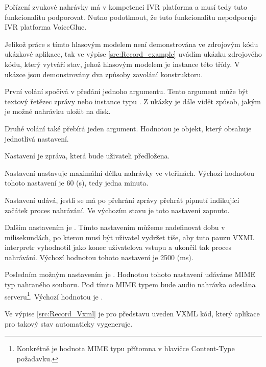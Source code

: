 \documentclass[ing,male,java,dept460]{diploma}						%
\begin{document}
Pořízení zvukové nahrávky má v kompetenci IVR platforma a musí tedy tuto funkcionalitu podporovat. Nutno podotknout, že tuto funkcionalitu nepodporuje IVR platforma VoiceGlue.

Jelikož práce s tímto hlasovým modelem není demonstrována ve zdrojovým kódu ukázkové aplikace, tak ve výpise \ref{src:Record_example} uvádím ukázku zdrojového kódu, který vytváří stav, jehož hlasovým modelem je instance této třídy. V ukázce jsou demonstrovány dva způsoby zavolání konstruktoru.

První volání spočívá v předání jednoho argumentu. Tento argument může být textový řetězec zprávy nebo instance typu . Z ukázky je dále vidět způsob, jakým je možné nahrávku uložit na disk.

Druhé volání také přebírá jeden argument. Hodnotou je objekt, který obsahuje jednotlivá nastavení.

Nastavení  je zpráva, která bude uživateli předložena.

Nastavení  nastavuje maximální délku nahrávky ve vteřinách. Výchozí hodnotou tohoto nastavení je 60 (s), tedy jedna minuta.

Nastavení  udává, jestli se má po přehrání zprávy přehrát pípnutí indikující začátek proces nahrávání. Ve výchozím stavu je toto nastavení zapnuto.

Dalším nastavením je . Tímto nastavením můžeme nadefinovat dobu v milisekundách, po kterou musí být uživatel vydržet tiše, aby tuto pauzu VXML interpretr vyhodnotil jako konec uživatelova vstupu a ukončil tak proces nahrávání. Výchozí hodnotou tohoto nastavení je 2500 (ms).

Posledním možným nastavením je . Hodnotou tohoto nastavení udáváme MIME typ nahraného souboru. Pod tímto MIME typem bude audio nahrávka odeslána serveru\footnote{Konkrétně je hodnota MIME typu přítomna v hlavičce Content-Type požadavku.}. Výchozí hodnotou je .



Ve výpise \ref{src:Record_Vxml} je pro představu uveden VXML kód, který aplikace pro takový stav automaticky vygeneruje.


\end{document}
